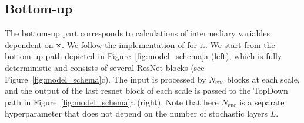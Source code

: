  \subsection{Bottom-up} \label{subsec:arch_encoder}
The bottom-up part corresponds to calculations of intermediary variables dependent on ${\mathbf{x}}$. We follow the implementation of \citet{Child2020-ze} for it. We start from the bottom-up path depicted in Figure~\ref{fig:model_schema}a (left), which is fully deterministic and consists of several ResNet blocks (see Figure~\ref{fig:model_schema}c). 
The input is processed by $N_{\text{enc}}$ blocks at each scale, and the output of the last resnet block of each scale is passed to the TopDown path in Figure~\ref{fig:model_schema}a (right). Note that here $N_{\text{enc}}$ is a separate hyperparameter that does not depend on the number of stochastic layers $L$.



